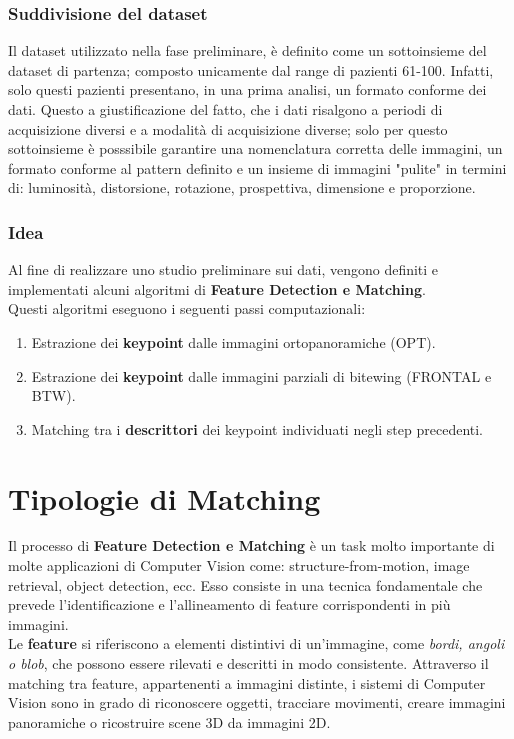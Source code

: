 \documentclass[12pt,a4paper,openright,twoside]{book}
\begin{document}
\subsection{Suddivisione del dataset}
Il dataset utilizzato nella fase preliminare, è definito come un sottoinsieme del dataset di partenza; composto unicamente dal range di pazienti 61-100. Infatti, solo questi pazienti presentano, in una prima analisi, un formato conforme dei dati. Questo a giustificazione del fatto, che i dati risalgono a periodi di acquisizione diversi e a modalità di acquisizione diverse; solo per questo sottoinsieme è posssibile garantire una nomenclatura corretta delle immagini, un formato conforme al pattern definito e un insieme di immagini "pulite" in termini di: luminosità, distorsione, rotazione, prospettiva, dimensione e proporzione.

\subsection{Idea}
Al fine di realizzare uno studio preliminare sui dati, vengono definiti e implementati alcuni algoritmi di \textbf{Feature Detection e Matching}.\\
Questi algoritmi eseguono i seguenti passi computazionali:
\begin{enumerate}
\item Estrazione dei \textbf{keypoint} dalle immagini ortopanoramiche (OPT).
\item Estrazione dei \textbf{keypoint} dalle immagini parziali di bitewing (FRONTAL e BTW).
\item Matching tra i \textbf{descrittori} dei keypoint individuati negli step precedenti.
\end{enumerate}

\chapter{Tipologie di Matching}
Il processo di \textbf{Feature Detection e Matching} è un task molto importante di molte applicazioni di Computer Vision come: structure-from-motion, image retrieval, object detection, ecc. Esso consiste in una tecnica fondamentale che prevede l'identificazione e l'allineamento di feature corrispondenti in più immagini.\\
Le \textbf{feature} si riferiscono a elementi distintivi di un'immagine, come  {\itshape bordi, angoli o blob}, che possono essere rilevati e descritti in modo consistente. Attraverso il matching tra feature, appartenenti a immagini distinte, i sistemi di Computer Vision sono in grado di riconoscere oggetti, tracciare movimenti, creare immagini panoramiche o ricostruire scene 3D da immagini 2D.\\
\end{document}
